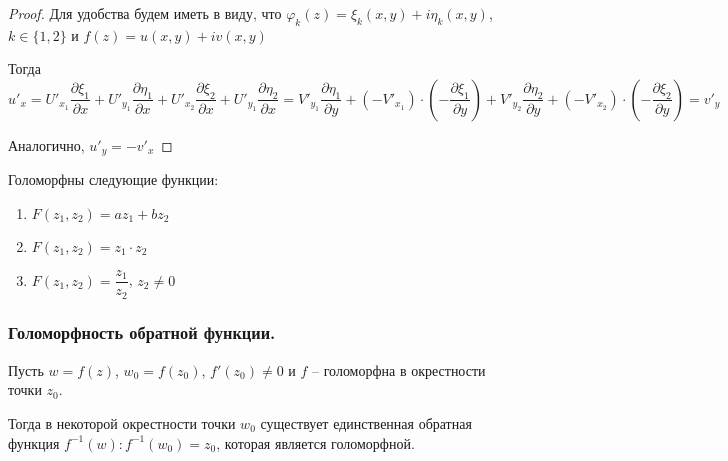 \begin{proof}
    Для удобства будем иметь в виду, что $\varphi_k(z) = \xi_k(x, y) + i \eta_k(x, y)$, $k \in \{1, 2\}$ и $f(z) = u(x, y) + iv(x, y)$
    
    Тогда
    \[
        u'_x = U'_{x_1}\dfrac{\partial \xi_1}{\partial x} + U'_{y_1}\dfrac{\partial \eta_1}{\partial x} + U'_{x_2}\dfrac{\partial \xi_2}{\partial x} + U'_{y_1}\dfrac{\partial \eta_2}{\partial x} = V'_{y_1}\dfrac{\partial \eta_1}{\partial y} + \left(-V'_{x_1}\right) \cdot \left( - \dfrac{\partial \xi_1}{\partial y} \right) + V'_{y_2} \dfrac{\partial \eta_2}{\partial y} + \left( -V'_{x_2} \right) \cdot \left( - \dfrac{\partial \xi_2}{\partial y} \right) = v'_y
    \]
        
    Аналогично, $u'_y = -v'_x$
\end{proof}

\begin{corollary}
    Голоморфны следующие функции:

    \begin{enumerate}
        \item $F(z_1, z_2) = az_1 + bz_2$
        \item $F(z_1, z_2) = z_1 \cdot z_2$
        \item $F(z_1, z_2) = \dfrac{z_1}{z_2}$, $z_2 \neq 0$
    \end{enumerate}
\end{corollary}

\subsubsection{Голоморфность обратной функции.}

\begin{theorem*}
    Пусть $w = f(z)$, $w_0 = f(z_0)$, $f'(z_0) \neq 0$ и $f$ -- голоморфна в окрестности точки $z_0$.

    Тогда в некоторой окрестности точки $w_0$ существует единственная обратная функция $f^{-1}(w): f^{-1}(w_0) = z_0$, которая является голоморфной.
\end{theorem*}

